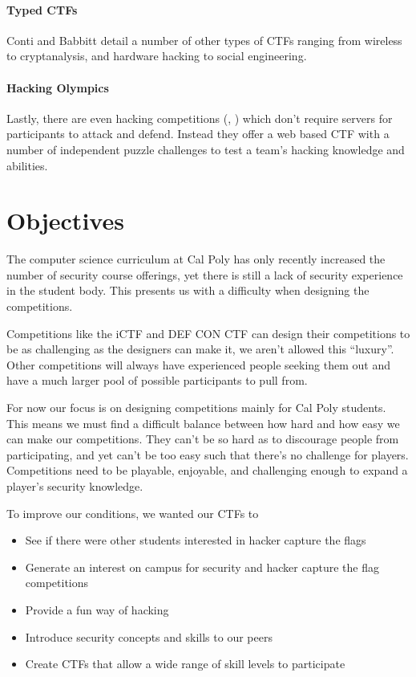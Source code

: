 \documentclass[10pt]{article}
\begin{document}
\paragraph*{Typed CTFs} Conti and Babbitt
\cite{HackingCompetitionsForSecurityEducation} detail a number of other types
of CTFs ranging from wireless to cryptanalysis, and hardware hacking to social
engineering.

\paragraph*{Hacking Olympics} \label{HackingOlympics} Lastly, there are even hacking 
competitions (\cite{Cipher}, \cite{SMPCTF}) which don't require servers for participants to
attack and defend. Instead they offer a web based CTF with a number of
independent puzzle challenges to test a team's hacking knowledge and abilities.

\section{Objectives}
\label{MainObjectives}
The computer science curriculum at Cal Poly has only recently increased the
number of security course offerings, yet there is still a lack of security
experience in the student body. This presents us with a difficulty when designing
the competitions. 

Competitions like the iCTF and DEF CON CTF can design their
competitions to be as challenging as the designers can make it, we aren't
allowed this ``luxury''. Other competitions will always have experienced people
seeking them out and have a much larger pool of possible participants to pull
from.

For now our focus is on designing competitions mainly for Cal Poly students.
This means we must find a difficult balance between how hard and how easy we can
make our competitions. They can't be so hard as to discourage people from
participating, and yet can't be too easy such that there's no challenge for
players. Competitions need to be playable, enjoyable, and challenging enough to
expand a player's security knowledge.

To improve our conditions, we wanted our CTFs to

\begin{itemize}
    \item See if there were other students interested in hacker capture the flags
    \item Generate an interest on campus for security and hacker capture the 
      flag competitions
    \item Provide a fun way of hacking 
    \item Introduce security concepts and skills to our peers
    \item Create CTFs that allow a wide range of skill levels to participate
\end{itemize}
\end{document}
